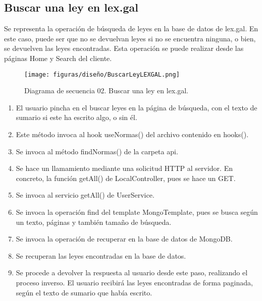 \subsection{Buscar una ley en lex.gal}

Se representa la operación de búsqueda de leyes en la base de datos de lex.gal. En este caso, puede ser que no se devuelvan leyes si no se encuentra ninguna, o bien, se devuelven las leyes encontradas. Esta operación se puede realizar desde las páginas Home y Search del cliente.

\begin{figure}[H]
\centerline{\texttt{[image: figuras/diseño/BuscarLeyLEXGAL.png]}}
\caption{Diagrama de secuencia 02. Buscar una ley en lex.gal.}
\label{enlaceDBuscar}
\end{figure}

\begin{enumerate}
    \item El usuario pincha en el buscar leyes en la página de búsqueda, con el texto de sumario si este ha escrito algo, o sin él.
    \item Este método invoca al hook useNormas() del archivo contenido en hooks().
    \item Se invoca al método findNormas() de la carpeta api.
    \item Se hace un llamamiento mediante una solicitud HTTP al servidor. En concreto, la función getAll() de LocalController, pues se hace un GET.
    \item Se invoca al servicio getAll() de UserService.
    \item Se invoca la operación find del template MongoTemplate, pues se busca según un texto, páginas y también tamaño de búsqueda.
    \item Se invoca la operación de recuperar en la base de datos de MongoDB.
    \item Se recuperan las leyes encontradas en la base de datos.
    \item Se procede a devolver la respuesta al usuario desde este paso, realizando el proceso inverso. El usuario recibirá las leyes encontradas de forma paginada, según el texto de sumario que había escrito.
\end{enumerate}